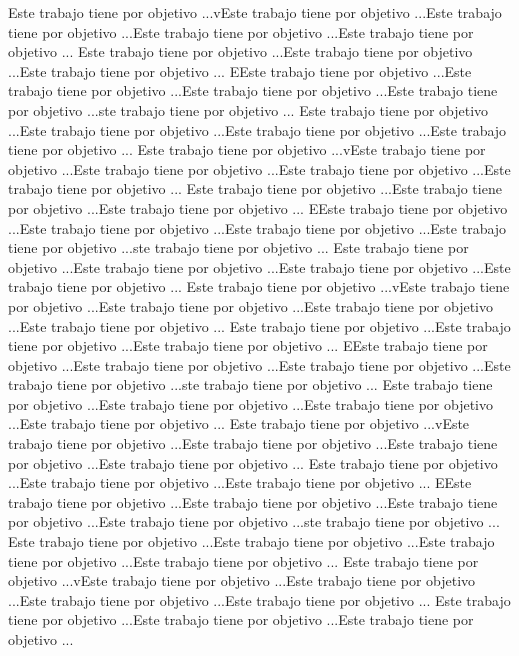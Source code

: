 Este trabajo tiene por objetivo ...vEste trabajo tiene por objetivo ...Este trabajo tiene por objetivo ...Este trabajo tiene por objetivo ...Este trabajo tiene por objetivo ...
Este trabajo tiene por objetivo ...Este trabajo tiene por objetivo ...Este trabajo tiene por objetivo ...
EEste trabajo tiene por objetivo ...Este trabajo tiene por objetivo ...Este trabajo tiene por objetivo ...Este trabajo tiene por objetivo ...ste trabajo tiene por objetivo ...
Este trabajo tiene por objetivo ...Este trabajo tiene por objetivo ...Este trabajo tiene por objetivo ...Este trabajo tiene por objetivo ...
Este trabajo tiene por objetivo ...vEste trabajo tiene por objetivo ...Este trabajo tiene por objetivo ...Este trabajo tiene por objetivo ...Este trabajo tiene por objetivo ...
Este trabajo tiene por objetivo ...Este trabajo tiene por objetivo ...Este trabajo tiene por objetivo ...
EEste trabajo tiene por objetivo ...Este trabajo tiene por objetivo ...Este trabajo tiene por objetivo ...Este trabajo tiene por objetivo ...ste trabajo tiene por objetivo ...
Este trabajo tiene por objetivo ...Este trabajo tiene por objetivo ...Este trabajo tiene por objetivo ...Este trabajo tiene por objetivo ...
Este trabajo tiene por objetivo ...vEste trabajo tiene por objetivo ...Este trabajo tiene por objetivo ...Este trabajo tiene por objetivo ...Este trabajo tiene por objetivo ...
Este trabajo tiene por objetivo ...Este trabajo tiene por objetivo ...Este trabajo tiene por objetivo ...
EEste trabajo tiene por objetivo ...Este trabajo tiene por objetivo ...Este trabajo tiene por objetivo ...Este trabajo tiene por objetivo ...ste trabajo tiene por objetivo ...
Este trabajo tiene por objetivo ...Este trabajo tiene por objetivo ...Este trabajo tiene por objetivo ...Este trabajo tiene por objetivo ...
Este trabajo tiene por objetivo ...vEste trabajo tiene por objetivo ...Este trabajo tiene por objetivo ...Este trabajo tiene por objetivo ...Este trabajo tiene por objetivo ...
Este trabajo tiene por objetivo ...Este trabajo tiene por objetivo ...Este trabajo tiene por objetivo ...
EEste trabajo tiene por objetivo ...Este trabajo tiene por objetivo ...Este trabajo tiene por objetivo ...Este trabajo tiene por objetivo ...ste trabajo tiene por objetivo ...
Este trabajo tiene por objetivo ...Este trabajo tiene por objetivo ...Este trabajo tiene por objetivo ...Este trabajo tiene por objetivo ...
Este trabajo tiene por objetivo ...vEste trabajo tiene por objetivo ...Este trabajo tiene por objetivo ...Este trabajo tiene por objetivo ...Este trabajo tiene por objetivo ...
Este trabajo tiene por objetivo ...Este trabajo tiene por objetivo ...Este trabajo tiene por objetivo ...

